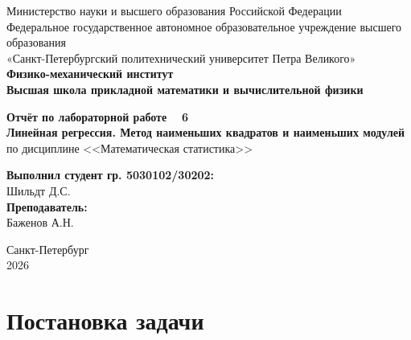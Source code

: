 \documentclass[a4paper, 14pt]{extarticle}
\begin{document}
\begin{titlepage}
    \begin{center}
        Министерство науки и высшего образования Российской Федерации\\
        Федеральное государственное автономное образовательное учреждение высшего образования\\
        «Санкт-Петербургский политехнический университет Петра Великого»\\
        
        \textbf{Физико-механический институт}\\
        \textbf{Высшая школа прикладной математики и вычислительной физики}
    \end{center}

    \vfill
    
    \begin{center}
        \textbf{Отчёт по лабораторной работе \textnumero~ 6\\[0.5cm]}
        \textbf{Линейная регрессия. Метод наименьших квадратов и наименьших модулей\\}
        по дисциплине <<Математическая статистика>>
    \end{center}

    \vfill

    \hfill
    \begin{minipage}{0.45\textwidth}
        \textbf{Выполнил студент гр. 5030102/30202:}\\
        Шильдт Д.С.\\[0.5cm]
        \textbf{Преподаватель:}\\ 
        Баженов А.Н.
    \end{minipage}

    \vfill

    \begin{center}
        Санкт-Петербург\\2026
    \end{center}
\end{titlepage}

\setcounter{page}{2}

\tableofcontents
\newpage

\section{Постановка задачи}
\end{document}

